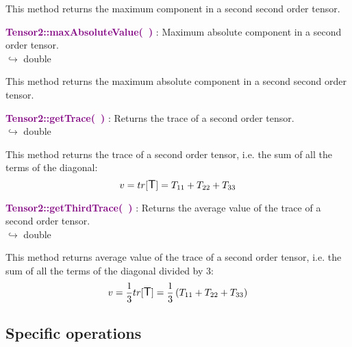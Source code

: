 This method returns the maximum component in a second second order tensor.

\textcolor{purple}{\textbf{Tensor2::maxAbsoluteValue(~)}}\label{Tensor2::maxAbsoluteValue()} : Maximum absolute component in a second order tensor.\\ \hspace*{5mm}$\hookrightarrow$ double

This method returns the maximum absolute component in a second second order tensor.

\textcolor{purple}{\textbf{Tensor2::getTrace(~)}}\label{Tensor2::getTrace()} : Returns the trace of a second order tensor.\\ \hspace*{5mm}$\hookrightarrow$ double

  This method returns the trace of a second order tensor, i.e. the sum of all the terms of the diagonal:
\begin{equation*}
v = tr[\mbox{\large\ensuremath{\mathsf{T}}}] = T_{11}+T_{22}+T_{33}
\end{equation*}

\textcolor{purple}{\textbf{Tensor2::getThirdTrace(~)}}\label{Tensor2::getThirdTrace()} : Returns the average value of the trace of a second order tensor.\\ \hspace*{5mm}$\hookrightarrow$ double

This method returns average value of the trace of a second order tensor, i.e. the sum of all the terms of the diagonal divided by 3:
\begin{equation*}
v = \frac{1}{3} tr[\mbox{\large\ensuremath{\mathsf{T}}}] =  \frac{1}{3} \left( T_{11}+T_{22}+T_{33} \right)
\end{equation*}

\subsection{Specific operations}

